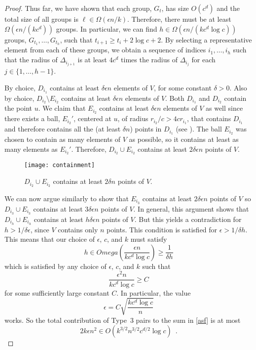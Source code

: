 \documentclass{patmorin}
\begin{document}
\begin{proof}
  Thus far, we have shown that each group, $G_t$, has size $O(c^d)$
  and the total size of all groups is $\ell\in\Omega(\epsilon n/k)$.
  Therefore, there must be at least $\Omega(\epsilon n/(kc^d))$ groups.
  In particular, we can find $h\in\Omega(\epsilon n/(kc^d\log c))$ groups,
  $G_{t_1},\ldots,G_{t_h}$, such that $t_{i+1} \ge t_{i}+2\log c+2$.
  By selecting a representative element from each of these groups, we
  obtain a sequence of indices $i_1,\ldots,i_h$ such that the radius of
  $\Delta_{i_{j+1}}$ is at least $4c^d$ times the radius of $\Delta_{i_j}$
  for each $j\in\{1,\ldots,h-1\}$.

  By choice, $D_{i_1}$ contains at least $\delta\epsilon n$ elements of $V$,
  for some constant $\delta >0$.
  Also by choice, $D_{i_2}\setminus E_{i_2}$ contains at least
  $\delta\epsilon n$ elements of $V$.  Both $D_{i_1}$ and $D_{i_2}$ contain
  the point $u$.  We claim that $E_{i_2}$
  contains at least $\delta\epsilon n$ elements of $V$ as well since there
  exists a ball, $E_{i_2}'$, centered at $u$, of radius $r_{i_2}/c >
  4cr_{i_1}$, that contains $D_{i_1}$ and therefore contains all the
  (at least $\delta n$) points in $D_{i_1}$ (see ).
  The ball $E_{i_2}$ was chosen to contain as many elements of $V$ as
  possible, so it contains at least as many elements as $E_{i_2}'$.
  Therefore, $D_{i_2}\cup E_{i_2}$ contains at least $2\delta \epsilon n$
  points of $V$.

  \begin{figure}
     \begin{center}
       \texttt{[image: containment]}
     \end{center}
     \caption{$D_{i_2}\cup E_{i_2}$ contains at least $2\delta n$ 
              points of $V$.}
   \end{figure}

  We can now argue similarly to show that $E_{i_3}$ contains at least
  $2\delta\epsilon n$ points of $V$ so $D_{i_3}\cup E_{i_3}$ contains at least
  $3\delta\epsilon n$ points of $V$.  In general, this argument shows that
  $D_{i_h}\cup E_{i_h}$ contains at least $h\delta\epsilon n$ points of $V$.
  But this yields a contradiction for $h> 1/\delta\epsilon$, since $V$ contains
  only $n$ points.  This condition is satisfied for $\epsilon > 1/\delta h$.
  This means that our choice of $\epsilon$, $c$, and $k$ must satisfy
  \[
       h\in Omega\left(\frac{\epsilon n}{kc^d\log c}\right) \ge
          \frac{1}{\delta h}
  \]
  which is satisfied by any choice of $\epsilon$, $c$, and $k$ such that
  \[
       \frac{\epsilon^2 n}{kc^d\log c} \ge C
  \]
  for some sufficiently large constant $C$.  In particular, the value
  \[
       \epsilon = C\sqrt{\frac{kc^d\log c}{n}}
  \]
  works.
  So the total contribution of Type~3 pairs to the sum in \eqref{asf}
  is at most
  \[
    2k\epsilon n^2 \in O(k^{3/2}n^{3/2}c^{d/2}\log c) \enspace .
  \]


\end{proof}
\end{document}
